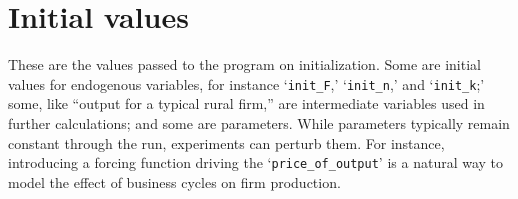 \chapter{Initial values} \label{appendix-parameters}

These are the values passed to the program on initialization.  Some are initial values for endogenous variables, %
for instance `\texttt{init\_F},' `\texttt{init\_n},' and `\texttt{init\_k};' %
some, like ``output for a typical rural firm,'' are intermediate variables used in further calculations;  %
and some are parameters.  While parameters typically remain constant through the run, experiments can perturb them. For instance, introducing a forcing function driving the `\texttt{price\_of\_output}' is a natural way to model the effect of business cycles on firm production. 

